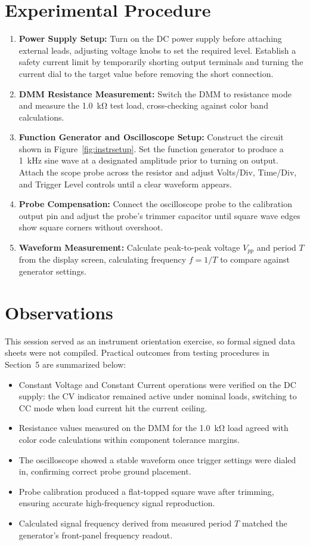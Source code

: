 \section{Experimental Procedure}
\begin{enumerate}
	\item \textbf{Power Supply Setup:} Turn on the DC power supply before attaching external leads, adjusting voltage knobs to set the required level. Establish a safety current limit by temporarily shorting output terminals and turning the current dial to the target value before removing the short connection.
	\item \textbf{DMM Resistance Measurement:} Switch the DMM to resistance mode and measure the \qty{1.0}{\kilo\ohm} test load, cross-checking against color band calculations.
	\item \textbf{Function Generator and Oscilloscope Setup:} Construct the circuit shown in Figure~\ref{fig:instrsetup}. Set the function generator to produce a \qty{1}{\kilo\hertz} sine wave at a designated amplitude prior to turning on output. Attach the scope probe across the resistor and adjust Volts/Div, Time/Div, and Trigger Level controls until a clear waveform appears.
	\item \textbf{Probe Compensation:} Connect the oscilloscope probe to the calibration output pin and adjust the probe's trimmer capacitor until square wave edges show square corners without overshoot.
	\item \textbf{Waveform Measurement:} Calculate peak-to-peak voltage $V_{pp}$ and period $T$ from the display screen, calculating frequency $f = 1/T$ to compare against generator settings.
\end{enumerate}

\section{Observations}
This session served as an instrument orientation exercise, so formal signed data sheets were not compiled. Practical outcomes from testing procedures in Section~5 are summarized below:

\begin{itemize}
	\item Constant Voltage and Constant Current operations were verified on the DC supply: the CV indicator remained active under nominal loads, switching to CC mode when load current hit the current ceiling.
	\item Resistance values measured on the DMM for the \qty{1.0}{\kilo\ohm} load agreed with color code calculations within component tolerance margins.
	\item The oscilloscope showed a stable waveform once trigger settings were dialed in, confirming correct probe ground placement.
	\item Probe calibration produced a flat-topped square wave after trimming, ensuring accurate high-frequency signal reproduction.
	\item Calculated signal frequency derived from measured period $T$ matched the generator's front-panel frequency readout.
\end{itemize}

